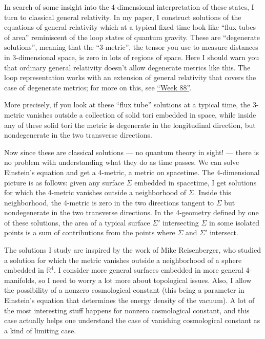\documentclass{article}
\begin{document}
In search of some insight into the 4-dimensional interpretation of these
states, I turn to classical general relativity. In my paper, I construct
solutions of the equations of general relativity which at a typical
fixed time look like ``flux tubes of area'' reminiscent of the loop
states of quantum gravity. These are ``degenerate solutions'', meaning
that the ``3-metric'', the tensor you use to measure distances in
3-dimensional space, is zero in lots of regions of space. Here I should
warn you that ordinary general relativity doesn't allow degenerate
metrics like this. The loop representation works with an extension of
general relativity that covers the case of degenerate metrics; for more
on this, see \protect\hyperlink{week88}{``Week 88''}.

More precisely, if you look at these ``flux tube'' solutions at a
typical time, the 3-metric vanishes outside a collection of solid tori
embedded in space, while inside any of these solid tori the metric is
degenerate in the longitudinal direction, but nondegenerate in the two
transverse directions.

Now since these are classical solutions --- no quantum theory in sight!
--- there is no problem with understanding what they do as time passes.
We can solve Einstein's equation and get a 4-metric, a metric on
spacetime. The 4-dimensional picture is as follows: given any surface
\(\Sigma\) embedded in spacetime, I get solutions for which the 4-metric
vanishes outside a neighborhood of \(\Sigma\). Inside this neighborhood,
the 4-metric is zero in the two directions tangent to \(\Sigma\) but
nondegenerate in the two transverse directions. In the 4-geometry
defined by one of these solutions, the area of a typical surface
\(\Sigma'\) intersecting \(\Sigma\) in some isolated points is a sum of
contributions from the points where \(\Sigma\) and \(\Sigma'\)
intersect.

The solutions I study are inspired by the work of Mike Reisenberger, who
studied a solution for which the metric vanishes outside a neighborhood
of a sphere embedded in \(\mathbb{R}^4\). I consider more general
surfaces embedded in more general 4-manifolds, so I need to worry a lot
more about topological issues. Also, I allow the possibility of a
nonzero cosmological constant (this being a parameter in Einstein's
equation that determines the energy density of the vacuum). A lot of the
most interesting stuff happens for nonzero cosmological constant, and
this case actually helps one understand the case of vanishing
cosmological constant as a kind of limiting case.
\end{document}
